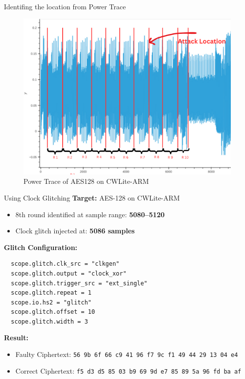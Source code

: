 \documentclass{beamer}
\newenvironment{tres important}[2][]{
	\setkeys{EmphEqEnv}{#2}
	\setkeys{EmphEqOpt}{box={\setlength{\fboxsep}{10pt}\fcolorbox{myNewColorA}{white}},#1}
	\EmphEqMainEnv}
{\endEmphEqMainEnv}
\begin{document}
\begin{frame}{Identifing the location from Power Trace}
  \begin{figure}
    \centering
    \includegraphics[width=0.7\linewidth]{images/1.png}
    \caption{Power Trace of AES128 on CWLite-ARM}
  \end{figure}
\end{frame}
\begin{frame}[fragile]{Using Clock Glitching}
  \textbf{Target:} AES-128 on CWLite-ARM
  
  \vspace{1mm}
  \begin{itemize}
    \item 8th round identified at sample range: \textbf{5080–5120}
    \item Clock glitch injected at: \textbf{5086 samples}
  \end{itemize}
  
  \textbf{Glitch Configuration:}
  \vspace{1mm}
  
  \begin{lstlisting}
  scope.glitch.clk_src = "clkgen"
  scope.glitch.output = "clock_xor"
  scope.glitch.trigger_src = "ext_single"
  scope.glitch.repeat = 1
  scope.io.hs2 = "glitch"
  scope.glitch.offset = 10
  scope.glitch.width = 3
  \end{lstlisting}
  
  \textbf{Result:}
  \begin{itemize}
    \item Faulty Ciphertext: \texttt{56 9b 6f 66 c9 41 96 f7 9c f1 49 44 29 13 04 e4}
    \item Correct Ciphertext: \texttt{f5 d3 d5 85 03 b9 69 9d e7 85 89 5a 96 fd ba af}
  \end{itemize}
  \end{frame}
\end{document}
